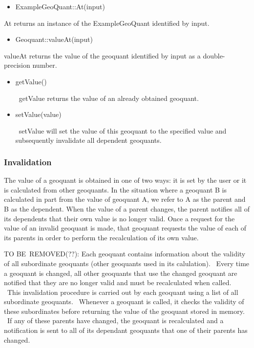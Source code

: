 \begin{itemize}
\item ExampleGeoQuant::At(input)
\end{itemize}

\qquad \qquad At returns an instance of the ExampleGeoQuant identified by
input.

\begin{itemize}
\item Geoquant::valueAt(input)
\end{itemize}

\qquad \qquad valueAt returns the value of the geoquant identified by input
as a double-precision number.

\begin{itemize}
\item getValue()

\ getValue returns the value of an already obtained geoquant.

\item setValue(value)

\ setValue will set the value of this geoquant to the specified value and
subsequently invalidate all dependent geoquants. 
\end{itemize}

\subsubsection{Invalidation}

The value of a geoquant is obtained in one of two ways: it is set by the
user or it is calculated from other geoquants. In the situation where a
geoquant B is calculated in part from the value of geoquant A, we refer to A
as the parent and B as the dependent. When the value of a parent changes,
the parent notifies all of its dependents that their own value is no longer
valid. Once a request for the value of an invalid geoquant is made, that
geoquant requests the value of each of its parents in order to perform the
recalculation of its own value.

TO BE\ REMOVED(??): Each geoquant contains information about the validity of
all subordinate geoquants (other geoquants used in its calulation). \ Every
time a geoquant is changed, all other geoquants that use the changed
geoquant are notified that they are no longer valid and must be recalculated
when called. \ This invalidation procedure is carried out by each geoquant
using a list of all subordinate geoquants. \ Whenever a geoquant is called,
it checks the validity of these subordinates before returning the value of
the geoquant stored in memory. \ If any of these parents have changed, the
geoquant is recalculated and a notification is sent to all of its dependant
geoquants that one of their parents has changed.

